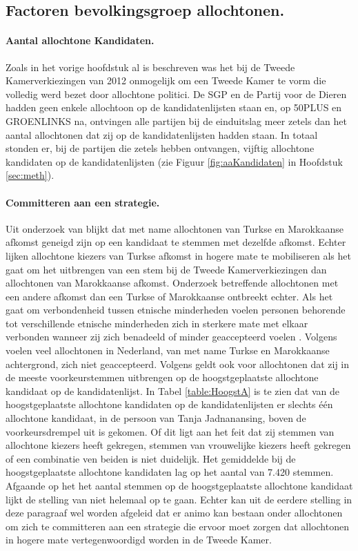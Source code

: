 \subsection{Factoren bevolkingsgroep allochtonen.}

\paragraph{Aantal allochtone Kandidaten.} 
Zoals in het vorige hoofdstuk al is beschreven was het bij de Tweede Kamerverkiezingen van 2012 onmogelijk om een Tweede Kamer te vorm die volledig werd bezet door allochtone politici. De SGP en de Partij voor de Dieren hadden geen enkele allochtoon op de kandidatenlijsten staan en, op 50PLUS en GROENLINKS na, ontvingen alle partijen bij de einduitslag meer zetels dan het aantal allochtonen dat zij op de kandidatenlijsten hadden staan. In totaal stonden er, bij de partijen die zetels hebben ontvangen, vijftig allochtone kandidaten op de kandidatenlijsten (zie Figuur \ref{fig:aaKandidaten} in Hoofdstuk \ref{sec:meth}). 


\paragraph{Committeren aan een strategie.}
Uit onderzoek van \citep{fennema2001civic} blijkt dat met name allochtonen van Turkse en Marokkaanse afkomst geneigd zijn op een kandidaat te stemmen met dezelfde afkomst. Echter lijken allochtone kiezers van Turkse afkomst in hogere mate te mobiliseren als het gaat om het uitbrengen van een stem bij de Tweede Kamerverkiezingen dan allochtonen van Marokkaanse afkomst. Onderzoek betreffende allochtonen met een andere afkomst dan een Turkse of Marokkaanse ontbreekt echter. Als het gaat om verbondenheid tussen etnische minderheden voelen personen behorende tot verschillende etnische minderheden zich in sterkere mate met elkaar verbonden wanneer zij zich benadeeld of minder geaccepteerd voelen \citep{schmitt2002meaning}. Volgens \cite{buijs2006strijders} voelen veel allochtonen in Nederland, van met name Turkse en Marokkaanse achtergrond, zich niet geaccepteerd. Volgens \cite{van2012tweede} geldt ook voor allochtonen dat zij in de meeste voorkeurstemmen uitbrengen op de hoogstgeplaatste allochtone kandidaat op de kandidatenlijst. In Tabel \ref{table:HoogstA} is te zien dat van de hoogstgeplaatste allochtone kandidaten op de kandidatenlijsten er slechts één allochtone kandidaat, in de persoon van Tanja Jadnanansing, boven de voorkeursdrempel uit is gekomen. Of dit ligt aan het feit dat zij stemmen van allochtone kiezers heeft gekregen, stemmen van vrouwelijke kiezers heeft gekregen of een combinatie ven beiden is niet duidelijk. Het gemiddelde bij de hoogstgeplaatste allochtone kandidaten lag op het aantal van 7.420 stemmen. Afgaande op het het aantal stemmen op de hoogstgeplaatste allochtone kandidaat lijkt de stelling van \cite{van2012tweede} niet helemaal op te gaan. Echter kan uit de eerdere stelling in deze paragraaf wel worden afgeleid dat er animo kan bestaan onder allochtonen om zich te committeren aan een strategie die ervoor moet zorgen dat allochtonen in hogere mate vertegenwoordigd worden in de Tweede Kamer. \\


